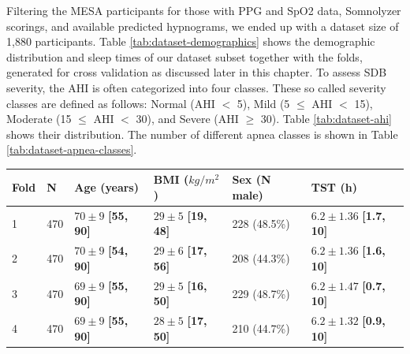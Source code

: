 Filtering the MESA participants for those with PPG and SpO2 data, Somnolyzer scorings, and available predicted hypnograms, we ended up with a dataset size of 1,880 participants. Table \ref{tab:dataset-demographics} shows the demographic distribution and sleep times of our dataset subset together with the folds, generated for cross validation as discussed later in this chapter.
To assess SDB severity, the AHI is often categorized into four classes. These so called severity classes are defined as follows: Normal (AHI $<$ 5), Mild (5 $\le$ AHI $<$ 15), Moderate (15 $\le$ AHI $<$ 30), and Severe (AHI $\ge$ 30).
Table \ref{tab:dataset-ahi} shows their distribution.
The number of different apnea classes is shown in Table \ref{tab:dataset-apnea-classes}.

\renewcommand{\arraystretch}{1.5}
\begin{table}
    \centering
    \begin{tabular}{p{1cm} p{1cm} p{1.7cm} p{1.7cm} p{1.7cm} p{1.7cm}}
        Fold & N & Age \newline (years) & BMI \newline ($kg/m^2$) & Sex \newline (N male) & TST \newline (h) \\
        \hline
        1 & 470 & $70\pm9$ \newline \textbf{[55, 90]} & $29\pm5$ \newline \textbf{[19, 48]} & 228 \newline (48.5\%) & $6.2\pm1.36$ \newline \textbf{[1.7, 10]} \\
        2 & 470 & $70\pm9$ \newline \textbf{[54, 90]} & $29\pm6$ \newline \textbf{[17, 56]} & 208 \newline (44.3\%) & $6.2\pm1.36$ \newline \textbf{[1.6, 10]} \\
        3 & 470 & $69\pm9$ \newline \textbf{[55, 90]} & $29\pm5$ \newline \textbf{[16, 50]} & 229 \newline (48.7\%) & $6.2\pm1.47$ \newline \textbf{[0.7, 10]} \\
        4 & 470 & $69\pm9$ \newline \textbf{[55, 90]} & $28\pm5$ \newline \textbf{[17, 50]} & 210 \newline (44.7\%) & $6.2\pm1.32$ \newline \textbf{[0.9, 10]} \\

\end{tabular}
\end{table}
